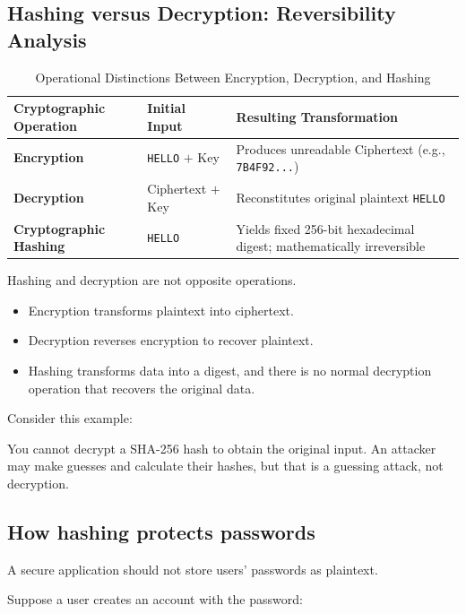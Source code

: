 \subsection{Hashing versus Decryption: Reversibility Analysis}

\begin{table}[htbp]
\centering
\caption{Operational Distinctions Between Encryption, Decryption, and Hashing}
\label{tab:hashing_vs_decryption}
\begin{tabularx}{\textwidth}{p{3.5cm} p{4.0cm} X}
\toprule
\textbf{Cryptographic Operation} & \textbf{Initial Input} & \textbf{Resulting Transformation} \\
\midrule
\textbf{Encryption} & \texttt{HELLO} $+$ Key & Produces unreadable Ciphertext (e.g., \texttt{7B4F92...}) \\
\textbf{Decryption} & Ciphertext $+$ Key & Reconstitutes original plaintext \texttt{HELLO} \\
\textbf{Cryptographic Hashing} & \texttt{HELLO} & Yields fixed 256-bit hexadecimal digest; mathematically irreversible \\
\bottomrule
\end{tabularx}
\end{table}

Hashing and decryption are not opposite operations.

\begin{itemize}
\item Encryption transforms plaintext into ciphertext.
\item Decryption reverses encryption to recover plaintext.
\item Hashing transforms data into a digest, and there is no normal decryption operation that recovers the original data.
\end{itemize}

Consider this example:


You cannot decrypt a SHA-256 hash to obtain the original input. An attacker may make guesses and calculate their hashes, but that is a guessing attack, not decryption.

\subsection{How hashing protects passwords}

A secure application should not store users' passwords as plaintext.

Suppose a user creates an account with the password:

